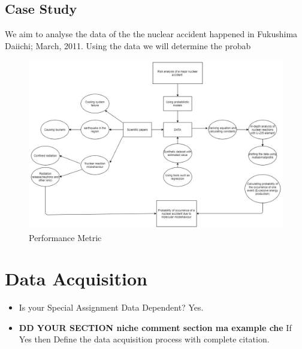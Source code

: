 \documentclass{article}
\begin{document}
\subsection{Case Study}
We aim to analyse the data of the the nuclear accident happened in Fukushima Daiichi; March, 2011. Using the data we will determine the probab
\begin{figure}
    \centering
  \includegraphics[scale=0.5]{Metric.jpg}
    \caption{Performance Metric}
    \label{fig:my_label}
\end{figure}


\section{Data Acquisition }

\begin{itemize}
    \item Is your Special Assignment Data Dependent? Yes.

    \item \textbf{DD YOUR SECTION niche comment section ma example che}
    If Yes then Define the data acquisition process with complete citation.
\end{itemize}
\end{document}
